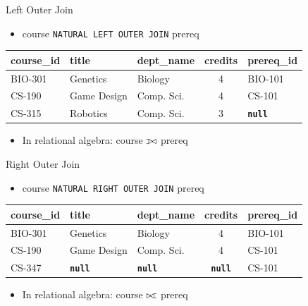 \documentclass{beamer}
\def\ojoin{\setbox0=\hbox{$\bowtie$}%
  \rule[-.02ex]{.25em}{.4pt}\llap{\rule[\ht0]{.25em}{.4pt}}}
\def\leftouterjoin{\mathbin{\ojoin\mkern-5.8mu\bowtie}}
\def\rightouterjoin{\mathbin{\bowtie\mkern-5.8mu\ojoin}}
\begin{document}
\begin{frame}{Left Outer Join}
    \begin{itemize}
        \item course \texttt{NATURAL LEFT OUTER JOIN} prereq
    \end{itemize}
    \vspace{5mm}
    \begin{tabular}{| l | l | l | c | l |}
        \hline
        \textbf{course\_id} & \textbf{title} & \textbf{dept\_name} & \textbf{credits} & \textbf{prereq\_id} \\
        \hline
        BIO-301 & Genetics    & Biology    & 4 & BIO-101 \\
        \hline
        CS-190  & Game Design & Comp. Sci. & 4 & CS-101  \\
        \hline
        CS-315  & Robotics    & Comp. Sci. & 3 & \textbf{\texttt{null}}\\
        \hline
    \end{tabular}
    \vspace{5mm}
    \begin{itemize}
        \item In relational algebra: course $\leftouterjoin$ prereq
    \end{itemize}
\end{frame}

\begin{frame}{Right Outer Join}
    \begin{itemize}
        \item course \texttt{NATURAL RIGHT OUTER JOIN} prereq
    \end{itemize}
    \vspace{5mm}
    \begin{tabular}{| l | l | l | c | l |}
        \hline
        \textbf{course\_id} & \textbf{title} & \textbf{dept\_name} & \textbf{credits} & \textbf{prereq\_id} \\
        \hline
        BIO-301 & Genetics    & Biology    & 4 & BIO-101 \\
        \hline
        CS-190  & Game Design & Comp. Sci. & 4 & CS-101  \\
        \hline
        CS-347  & \textbf{\texttt{null}}   & \textbf{\texttt{null}} & \textbf{\texttt{null}} & CS-101 \\
        \hline
    \end{tabular}
    \vspace{5mm}
    \begin{itemize}
        \item In relational algebra: course $\rightouterjoin$ prereq
    \end{itemize}
\end{frame}
\end{document}
